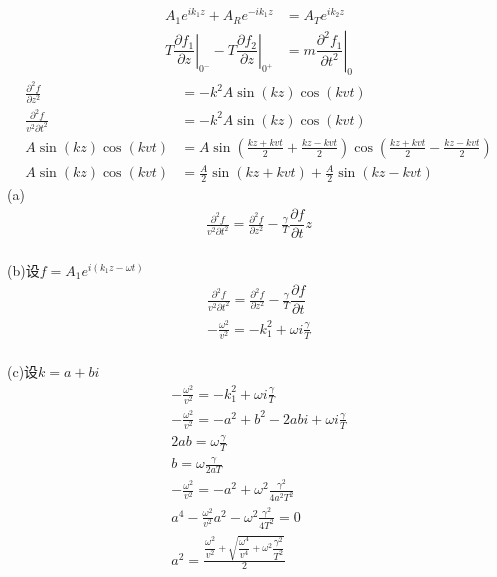 \begin{align*}
    A_1e^{ik_1z}+A_Re^{-ik_1z}&=A_Te^{ik_2z}\\
    T\left.\dfrac{\partial f_1}{\partial z}\right|_{0^-}-T\left.\dfrac{\partial f_2}{\partial z}\right|_{0^+}&=m\left.\dfrac{\partial^2 f_1}{\partial t^2}\right|_{0}
\end{align*}
\begin{align*}
    \frac{\partial^2 f}{\partial z^2}&=-k^2A\sin(kz)\cos(kvt)\\
    \frac{\partial^2 f}{v^2\partial t^2}&=-k^2A\sin(kz)\cos(kvt)\\
    A\sin(kz)\cos(kvt)&=A\sin\left(\frac{kz+kvt}{2}+\frac{kz-kvt}{2}\right)\cos\left(\frac{kz+kvt}{2}-\frac{kz-kvt}{2}\right)\\
    A\sin(kz)\cos(kvt)&=\frac{A}{2}\sin\left(kz+kvt\right)
    +\frac{A}{2}\sin\left(kz-kvt\right)
\end{align*}
(a)\begin{align*}
    \frac{\partial^2 f}{v^2\partial t^2}=\frac{\partial^2 f}{\partial z^2}-\frac{\gamma}{T}\dfrac{\partial f}{\partial t}z\\
\end{align*}

(b)设$f=A_1e^{i(k_1z-\omega t)}$\begin{align*}
    \frac{\partial^2 f}{v^2\partial t^2}=\frac{\partial^2 f}{\partial z^2}-\frac{\gamma}{T}\dfrac{\partial f}{\partial t}\\
    -\frac{\omega^2}{v^2}=-k_1^2+\omega i\frac{\gamma}{T}\\
\end{align*}

(c)设$k=a+bi$
\begin{align*}
    -\frac{\omega^2}{v^2}=-k_1^2+\omega i\frac{\gamma}{T}\\
    -\frac{\omega^2}{v^2}=-a^2+b^2-2abi+\omega i\frac{\gamma}{T}\\
    2ab=\omega \frac{\gamma}{T}\\
    b=\omega \frac{\gamma}{2aT}\\
    -\frac{\omega^2}{v^2}=-a^2+\omega^2\frac{\gamma^2}{4a^2T^2}\\
    a^4-\frac{\omega^2}{v^2}a^2-\omega^2\frac{\gamma^2}{4T^2}=0\\
    a^2=\frac{\dfrac{\omega^2}{v^2}+\sqrt{\dfrac{\omega^4}{v^4}+\omega^2\dfrac{\gamma^2}{T^2}}}{2}\\
\end{align*}

